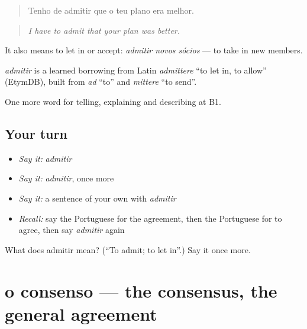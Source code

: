 \begin{quote}
Tenho de admitir que o teu plano era melhor.
\end{quote}

\begin{quote}
\emph{I have to admit that your plan was better.}
\end{quote}

It also means to let in or accept: \emph{admitir novos sócios} — to take in new members.

\begin{cousinweb}
\emph{admitir} is a learned borrowing from Latin \emph{admittere} \textquotedblleft{}to let in, to allow\textquotedblright{} (EtymDB), built from \emph{ad} \textquotedblleft{}to\textquotedblright{} and \emph{mittere} \textquotedblleft{}to send\textquotedblright{}.
\end{cousinweb}

\begin{grammarlens}[title={What you've built}]
One more word for telling, explaining and describing at B1.
\end{grammarlens}

\subsection*{Your turn}
\begin{itemize}
\raggedright
  \item \emph{Say it:} \emph{admitir}
  \item \emph{Say it:} \emph{admitir}, once more
  \item \emph{Say it:} a sentence of your own with \emph{admitir}
  \item \emph{Recall:} say the Portuguese for the agreement, then the Portuguese for to agree, then say \emph{admitir} again
\end{itemize}

\begin{tcolorbox}[breakable,colback=teal!4,colframe=teal!35!black,title={Before you move on}]
What does admitir mean? (\textquotedblleft{}To admit; to let in\textquotedblright{}.) Say it once more.
\end{tcolorbox}
\section[o consenso]{o consenso — the consensus, the general agreement}

\label{lesson:PT-C339-consenso}



